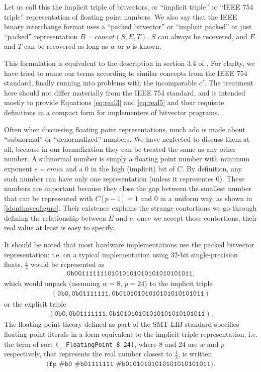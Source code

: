 \documentclass[letterpaper,10pt]{article}
\begin{document}
Let us call this the implicit triple of bitvectors, or ``implicit triple'' or ``IEEE 754 triple'' representation of floating point numbers. We also say that the IEEE binary interchange format uses a ``packed bitvector'' or ``implicit packed'' or just ``packed'' representation $B = concat(S, E, T)$. $S$ can always be recovered, and $E$ and $T$ can be recovered as long as $w$ or $p$ is known. 

This formulation is equivalent to the description in section 3.4 of \cite{ieee754-2008}. For clarity, we have tried to name our terms according to similar concepts from the IEEE 754 standard, finally running into problems with the incomparable $c'$. The treatment here should not differ materially from the IEEE 754 standard, and is intended mostly to provide Equations \ref{eq:real3} and \ref{eq:real5} and their requisite definitions in a compact form for implementers of bitvector programs.

Often when discussing floating point representations, much ado is made about ``subnormal'' or ``denormalized'' numbers. We have neglected to discuss them at all, because in our formalization they can be treated the same as any other number. A subnormal number is simply a floating point number with minimum exponent $e = emin$ and a 0 in the high (implicit) bit of $C$. By definition, any such number can have only one representation (unless it representes 0). These numbers are important because they close the gap between the smallest number that can be represented with $C[p-1] = 1$ and 0 in a uniform way, as shown in \ref{idonthaveafigure}. Their existence explains the strange contortions we go through defining the relationship between $E$ and $e$; once we accept those contortions, their real value at least is easy to specify.

It should be noted that most hardware implementations use the packed bitvector representation; i.e. on a typical implementation using 32-bit single-precision floats, $\frac{4}{3}$ would be represented as 
\begin{align*}
 \texttt{0b00111111101010101010101010101011} \text{,}
\end{align*}
which would unpack (assuming $w=8$, $p=24$) to the implicit triple 
\begin{align*}
 (\texttt{0b0}, \texttt{0b01111111}, \texttt{0b01010101010101010101011})
\end{align*}
or the explicit triple 
\begin{align*}
 (\texttt{0b0}, \texttt{0b01111111}, \texttt{0b101010101010101010101011}) \text{.}
\end{align*}
The floating point theory defined as part of the SMT-LIB standard specifies floating point literals in a form equivalent to the implicit triple representation, i.e. the term of sort \texttt{(\_ FloatingPoint 8 24)}, where 8 and 24 are $w$ and $p$ respectively, that represents the real number closest to $\frac{4}{3}$, is written 
\begin{align*}
 \texttt{(fp \#b0 \#b01111111 \#b01010101010101010101011)} \text{.}
\end{align*}
\end{document}

